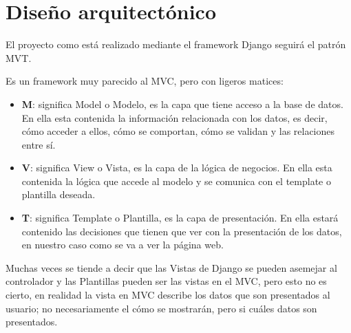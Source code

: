 
\section{Diseño arquitectónico}

El proyecto como está realizado mediante el framework Django seguirá el patrón MVT\cite{MVT}.

Es un framework muy parecido al MVC, pero con ligeros matices:
\begin{itemize}
	\item \textbf{M}: significa Model o Modelo, es la capa que tiene acceso a la base de datos. En ella esta contenida la información relacionada con los datos, es decir, cómo acceder a ellos, cómo se comportan, cómo se validan y las relaciones entre sí.
	\item \textbf{V}: significa View o Vista, es la capa de la lógica de negocios. En ella esta contenida la lógica que accede al modelo y se comunica con el template o plantilla deseada. 
	\item \textbf{T}: significa Template o Plantilla, es la capa de presentación. En ella estará contenido las decisiones que tienen que ver con la presentación de los datos, en nuestro caso como se va a ver la página web.
\end{itemize}

Muchas veces se tiende a decir que las Vistas de Django se pueden asemejar al controlador y las Plantillas pueden ser las vistas en el MVC, pero esto no es cierto, en realidad la vista en MVC describe los datos que son presentados al usuario; no necesariamente el cómo se mostrarán, pero si cuáles datos son presentados.